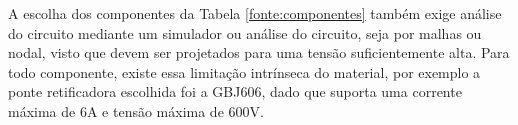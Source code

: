\documentclass[a4paper,12pt,oneside,openany,table,xcdraw]{article}
\begin{document}
A escolha dos componentes da Tabela \ref{fonte:componentes} também exige análise do circuito mediante um simulador ou análise do circuito, seja por malhas ou nodal, visto que devem ser projetados para uma tensão suficientemente alta. Para todo componente, existe essa limitação intrínseca do material, por exemplo a ponte retificadora escolhida foi a GBJ606, dado que suporta uma corrente máxima de 6A e tensão máxima de 600V.

\begin{table}[H]
\def\arraystretch{1.28}
\centering
\caption{Componentes e orçamento da fonte.}
\label{fonte:componentes}
\end{table}
\end{document}
